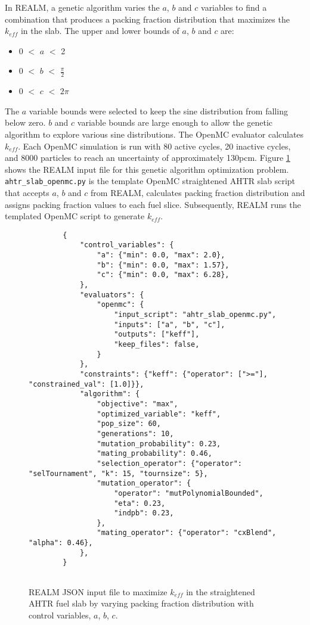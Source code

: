 In \gls{REALM}, a genetic algorithm varies the $a$, $b$ and $c$ variables to find a combination 
that produces a packing fraction distribution that maximizes the $k_{eff}$ in 
the slab. 
The upper and lower bounds of $a$, $b$ and $c$ are: 
\begin{itemize}
    \item 0 $<$ $a$ $<$ 2 
    \item 0 $<$ $b$ $<$ $\frac{\pi}{2}$
    \item 0 $<$ $c$ $<$ $2\pi$
\end{itemize}
The $a$ variable bounds were selected to keep the sine distribution from falling 
below zero. $b$ and $c$ variable bounds are large enough to allow the genetic 
algorithm to explore various sine distributions. 
The OpenMC evaluator calculates $k_{eff}$. 
Each OpenMC simulation is run with 80 active cycles, 20 inactive cycles, and 
8000 particles to reach an uncertainty of approximately 130pcm. 
Figure \ref{fig:realm-input-simple} shows the \gls{REALM} input file for this 
genetic algorithm optimization problem. 
\texttt{ahtr\_slab\_openmc.py} is the template OpenMC straightened \gls{AHTR} 
slab script that accepts $a$, $b$ and $c$ from \gls{REALM}, calculates packing 
fraction distribution and assigns packing fraction values to each fuel slice. 
Subsequently, \gls{REALM} runs the templated OpenMC script to generate $k_{eff}$. 
\begin{figure}[]
    \begin{verbatim}
        {
            "control_variables": {
                "a": {"min": 0.0, "max": 2.0},
                "b": {"min": 0.0, "max": 1.57},
                "c": {"min": 0.0, "max": 6.28},
            },
            "evaluators": {
                "openmc": {
                    "input_script": "ahtr_slab_openmc.py",
                    "inputs": ["a", "b", "c"],
                    "outputs": ["keff"],
                    "keep_files": false,
                }
            },
            "constraints": {"keff": {"operator": [">="], "constrained_val": [1.0]}},
            "algorithm": {
                "objective": "max",
                "optimized_variable": "keff",
                "pop_size": 60,
                "generations": 10,
                "mutation_probability": 0.23,
                "mating_probability": 0.46,
                "selection_operator": {"operator": "selTournament", "k": 15, "tournsize": 5},
                "mutation_operator": {
                    "operator": "mutPolynomialBounded",
                    "eta": 0.23,
                    "indpb": 0.23,
                },
                "mating_operator": {"operator": "cxBlend", "alpha": 0.46},
            },
        }
        
    \end{verbatim}
    \caption{\acrfull{REALM} JSON input file to maximize $k_{eff}$ in the 
    straightened \acrfull{AHTR} fuel slab by varying packing fraction distribution 
    with control variables, $a$, $b$, $c$.}
    \label{fig:realm-input-simple}
\end{figure}

